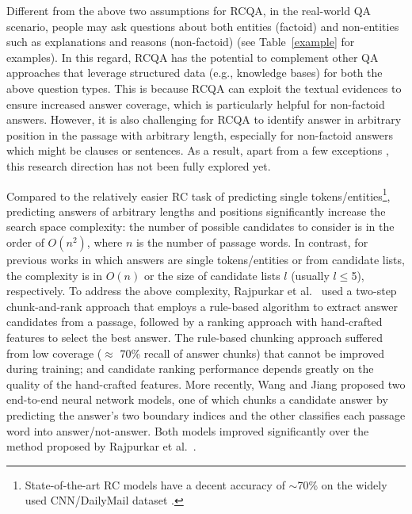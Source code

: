 \documentclass[letterpaper]{article}
\begin{document}
Different from the above two assumptions for RCQA, in the real-world QA scenario, people may ask questions about both entities (factoid) and non-entities such as explanations and reasons (non-factoid) (see Table~\ref{example} for examples). 
In this regard, RCQA has the potential to complement other QA approaches that leverage structured data (e.g., knowledge bases) for both the above question types. This is because RCQA can exploit the textual evidences to ensure increased answer coverage, which is particularly helpful for non-factoid answers.
However, it is also challenging for RCQA to identify answer in arbitrary position in the passage with arbitrary length, especially for non-factoid answers which might be clauses or sentences.
As a result, apart from a few exceptions \cite{rajpurkar2016squad,wang2016machine}, this research direction has not been fully explored yet. 

Compared to the relatively easier RC task of predicting single tokens/entities\footnote{State-of-the-art RC models have a decent accuracy of $\sim$70\% on the widely used CNN/DailyMail dataset \cite{hermann2015teaching}.}, 
predicting answers of arbitrary lengths and positions significantly increase the search space complexity:
the number of possible candidates to consider is in the order of $O(n^{2})$, where $n$ is the number of passage words. In contrast, for previous works in which answers are single tokens/entities or from candidate lists, the complexity is in $O(n)$ or the size of candidate lists $l$ (usually $l\leq$5), respectively.
To address the above complexity, Rajpurkar et al.~ used a two-step chunk-and-rank approach that employs a rule-based algorithm to extract answer candidates from a passage, followed by a ranking approach with hand-crafted features to select the best answer. The rule-based chunking approach suffered from low coverage ($\approx$ 70\% recall of answer chunks) that cannot be improved during training; and candidate ranking performance depends greatly on the quality of the hand-crafted features. More recently, Wang and Jiang  proposed two end-to-end neural network models, one of which chunks a candidate answer by predicting the answer's two boundary indices and the other classifies each passage word into answer/not-answer. Both models improved significantly over the method proposed by Rajpurkar et al.~.
\end{document}

